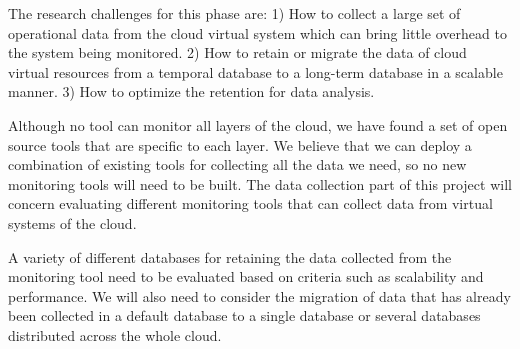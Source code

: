 The research challenges for this phase are: 
1) How to collect a large set of operational data from the cloud virtual system which can bring little overhead to the system being monitored. 
2) How to retain or migrate the data of cloud virtual resources from a temporal database to a long-term database in a scalable manner.
3) How to optimize the retention for data analysis.

Although no tool can monitor all layers of the cloud, we have found a set of open source tools that are specific to each layer. We believe that we can deploy a combination of existing tools for collecting all the data we need, so no new monitoring tools will need to be built. The data collection part of this project will concern evaluating different monitoring tools that can collect data from virtual systems of the cloud. 

A variety of different databases for retaining the data collected from the monitoring tool need to be evaluated based on criteria such as scalability and performance. We will also need to consider the migration of data that has already been collected in a default database to a single database or several databases distributed across the whole cloud.



%




